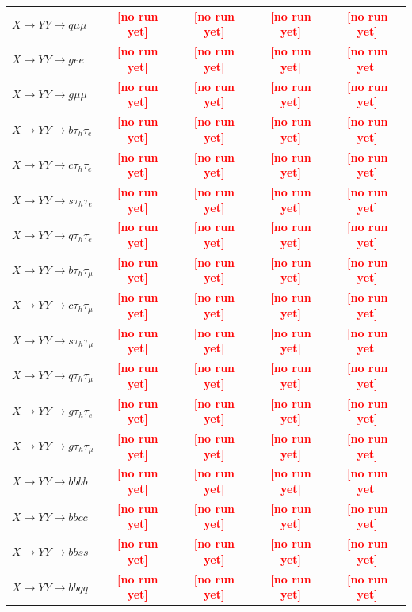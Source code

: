 \documentclass[12pt]{article}   %
\newcommand{\pending}[1]{\textcolor{red}{\textbf{[#1]}}}
\begin{document}
\begin{landscape}
{\begin{longtable}{@{\extracolsep{\fill}}lcccc@{}}
$X\to YY\to q\mu\mu$ & \pending{no run yet} & \pending{no run yet} & \pending{no run yet} & \pending{no run yet} \\
$X\to YY\to gee$ & \pending{no run yet} & \pending{no run yet} & \pending{no run yet} & \pending{no run yet} \\
$X\to YY\to g\mu\mu$ & \pending{no run yet} & \pending{no run yet} & \pending{no run yet} & \pending{no run yet} \\
\midrule
$X\to YY\to b\tau_h\tau_e$ & \pending{no run yet} & \pending{no run yet} & \pending{no run yet} & \pending{no run yet} \\
$X\to YY\to c\tau_h\tau_e$ & \pending{no run yet} & \pending{no run yet} & \pending{no run yet} & \pending{no run yet} \\
$X\to YY\to s\tau_h\tau_e$ & \pending{no run yet} & \pending{no run yet} & \pending{no run yet} & \pending{no run yet} \\
$X\to YY\to q\tau_h\tau_e$ & \pending{no run yet} & \pending{no run yet} & \pending{no run yet} & \pending{no run yet} \\
$X\to YY\to b\tau_h\tau_\mu$ & \pending{no run yet} & \pending{no run yet} & \pending{no run yet} & \pending{no run yet} \\
$X\to YY\to c\tau_h\tau_\mu$ & \pending{no run yet} & \pending{no run yet} & \pending{no run yet} & \pending{no run yet} \\
$X\to YY\to s\tau_h\tau_\mu$ & \pending{no run yet} & \pending{no run yet} & \pending{no run yet} & \pending{no run yet} \\
$X\to YY\to q\tau_h\tau_\mu$ & \pending{no run yet} & \pending{no run yet} & \pending{no run yet} & \pending{no run yet} \\
$X\to YY\to g\tau_h\tau_e$ & \pending{no run yet} & \pending{no run yet} & \pending{no run yet} & \pending{no run yet} \\
$X\to YY\to g\tau_h\tau_\mu$ & \pending{no run yet} & \pending{no run yet} & \pending{no run yet} & \pending{no run yet} \\
\midrule
$X\to YY\to bbbb$ & \pending{no run yet} & \pending{no run yet} & \pending{no run yet} & \pending{no run yet} \\
$X\to YY\to bbcc$ & \pending{no run yet} & \pending{no run yet} & \pending{no run yet} & \pending{no run yet} \\
$X\to YY\to bbss$ & \pending{no run yet} & \pending{no run yet} & \pending{no run yet} & \pending{no run yet} \\
$X\to YY\to bbqq$ & \pending{no run yet} & \pending{no run yet} & \pending{no run yet} & \pending{no run yet} \\

\end{longtable}}
\end{landscape}
\end{document}
